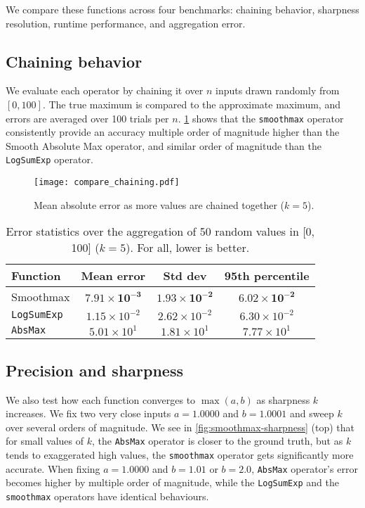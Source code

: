We compare these functions across four benchmarks: chaining behavior, sharpness resolution, runtime performance, and aggregation error.

\subsection*{Chaining behavior}

We evaluate each operator by chaining it over $n$ inputs drawn randomly from $[0, 100]$. The true maximum is compared to the approximate maximum, and errors are averaged over 100 trials per $n$. \cref{fig:smoothmax-chained-error} shows that the \texttt{smoothmax} operator consistently provide an accuracy multiple order of magnitude higher than the Smooth Absolute Max operator, and similar order of magnitude than the \texttt{LogSumExp} operator. 

\begin{figure}
    \centering
    \texttt{[image: compare\_chaining.pdf]}
    \caption{Mean absolute error as more values are chained together ($k = 5$).}
    \label{fig:smoothmax-chained-error}
\end{figure}

\begin{table}
    \centering
    \begin{tabular}{l|ccc}
        \toprule
        Function & Mean error & Std dev & 95th percentile \\
        \midrule
        Smoothmax & $\mathbf{7.91 \times 10^{-3}}$ & $\mathbf{1.93 \times 10^{-2}}$ & $\mathbf{6.02 \times 10^{-2}}$ \\
        \texttt{LogSumExp} & $1.15 \times 10^{-2}$ & $2.62 \times 10^{-2}$ & $6.30 \times 10^{-2}$ \\
        \texttt{AbsMax}    & $5.01 \times 10^{1}$  & $1.81 \times 10^{1}$  & $7.77 \times 10^{1}$ \\
        \bottomrule
    \end{tabular}
    \caption{Error statistics over the aggregation of 50 random values in [0, 100] ($k = 5$). For all, lower is better. }
    \label{tab:smoothmax-avg-error}
\end{table}

\subsection*{Precision and sharpness}

We also test how each function converges to $\max(a, b)$ as sharpness $k$ increases. We fix two very close inputs $a = 1.0000$ and $b = 1.0001$ and sweep $k$ over several orders of magnitude. We see in \cref{fig:smoothmax-sharpness} (top) that for small values of $k$, the \texttt{AbsMax} operator is closer to the ground truth, but as $k$ tends to exaggerated high values, the \texttt{smoothmax} operator gets significantly more accurate. When fixing $a = 1.0000$ and $b = 1.01$ or $b = 2.0$, \texttt{AbsMax} operator's error becomes higher by multiple order of magnitude, while the \texttt{LogSumExp} and the \texttt{smoothmax} operators have identical behaviours.

